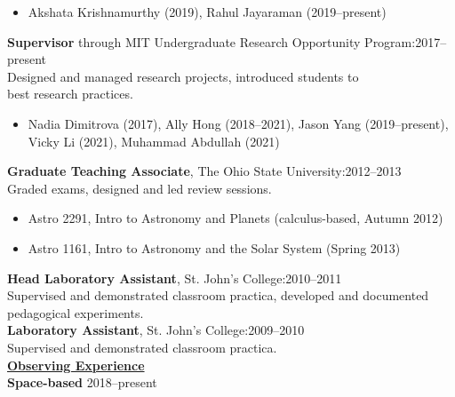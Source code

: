\documentclass[letterpaper,11pt]{article}
\begin{document}
\begin{itemize}[nosep,label=\textbullet]
\item Akshata Krishnamurthy (2019), Rahul Jayaraman (2019--present)
\end{itemize}
\textbf{Supervisor} through MIT Undergraduate Research Opportunity Program:\hfill2017--present\\
\indent Designed and managed research projects, introduced students to \\
\indent best research practices.
\begin{itemize}[nosep,label=\textbullet]
\item Nadia Dimitrova (2017), Ally Hong (2018--2021), Jason Yang (2019--present), \\
  Vicky Li (2021), Muhammad Abdullah (2021)
\end{itemize}\textbf{Graduate Teaching Associate}, The Ohio State University:\hfill2012--2013\\
\indent Graded exams, designed and led review sessions.
\begin{itemize}[nosep, label=\textbullet]
\item Astro 2291,  Intro to Astronomy and Planets (calculus-based, Autumn 2012)
\item Astro 1161,  Intro to Astronomy and the Solar System (Spring 2013)
\end{itemize}
\textbf{Head Laboratory Assistant}, St. John's College:\hfill2010--2011\\
\indent Supervised and demonstrated classroom practica, developed and documented\\
 \indent  pedagogical experiments.\\
\textbf{Laboratory Assistant}, St. John's College:\hfill2009--2010\\
\indent Supervised and demonstrated classroom practica.\\
\clearpage
\noindent \underline{\textbf{Observing Experience}}\\
\textbf{Space-based}  \hfill 2018--present \\
\end{document}
